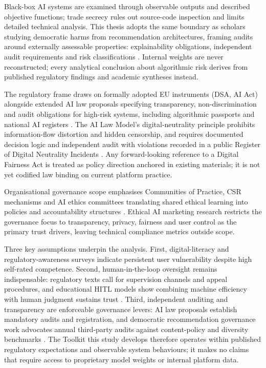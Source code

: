 \documentclass[11pt]{article}
\begin{document}
Black-box AI systems are examined through observable outputs and described objective functions; trade secrecy rules out source-code inspection and limits detailed technical analysis. This thesis adopts the same boundary as scholars studying democratic harms from recommendation architectures, framing audits around externally assessable properties: explainability obligations, independent audit requirements and risk classifications \parencites[6]{6502223}[16]{6502223}[244]{2977039}. Internal weights are never reconstructed; every analytical conclusion about algorithmic risk derives from published regulatory findings and academic syntheses instead.

The regulatory frame draws on formally adopted EU instruments (DSA, AI Act) alongside extended AI law proposals specifying transparency, non-discrimination and audit obligations for high-risk systems, including algorithmic passports and national AI registers \parencites[244]{2977039}[243]{2977039}. The AI Law Model's digital-neutrality principle prohibits information-flow distortion and hidden censorship, and requires documented decision logic and independent audit with violations recorded in a public Register of Digital Neutrality Incidents \parencites[109]{2977039}. Any forward-looking reference to a Digital Fairness Act \parencites[391]{7896734} is treated as policy direction anchored in existing materials; it is not yet codified law binding on current platform practice.

Organisational governance scope emphasises Communities of Practice, CSR mechanisms and AI ethics committees translating shared ethical learning into policies and accountability structures \parencites[11]{8200246}[16]{8200246}. Ethical AI marketing research \parencites[11]{8200246} restricts the governance focus to transparency, privacy, fairness and user control as the primary trust drivers, leaving technical compliance metrics outside scope.

Three key assumptions underpin the analysis. First, digital-literacy and regulatory-awareness surveys \parencites[2]{9360054} indicate persistent user vulnerability despite high self-rated competence. Second, human-in-the-loop oversight remains indispensable: regulatory texts call for supervision channels and appeal procedures, and educational HITL models show combining machine efficiency with human judgment sustains trust \parencites[244]{2977039}[21]{6805789}[3]{5683952}. Third, independent auditing and transparency are enforceable governance levers: AI law proposals establish mandatory audits and registration, and democratic recommendation governance work advocates annual third-party audits against content-policy and diversity benchmarks \parencites[16]{6502223}[244]{2977039}. The Toolkit this study develops therefore operates within published regulatory expectations and observable system behaviours; it makes no claims that require access to proprietary model weights or internal platform data.
\end{document}
